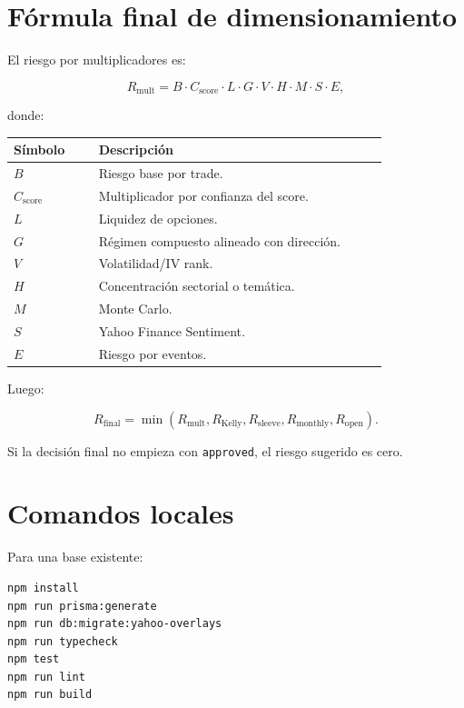 \documentclass[11pt,letterpaper]{article}
\begin{document}
\section{F\'ormula final de dimensionamiento}

El riesgo por multiplicadores es:

\[
R_{\text{mult}} =
B \cdot C_{\text{score}} \cdot L \cdot G \cdot V \cdot H \cdot M \cdot S \cdot E,
\]

donde:

\begin{longtable}{p{0.20\linewidth} p{0.68\linewidth}}
\toprule
\textbf{S\'imbolo} & \textbf{Descripci\'on} \\
\midrule
$B$ & Riesgo base por trade. \\
$C_{\text{score}}$ & Multiplicador por confianza del score. \\
$L$ & Liquidez de opciones. \\
$G$ & R\'egimen compuesto alineado con direcci\'on. \\
$V$ & Volatilidad/IV rank. \\
$H$ & Concentraci\'on sectorial o tem\'atica. \\
$M$ & Monte Carlo. \\
$S$ & Yahoo Finance Sentiment. \\
$E$ & Riesgo por eventos. \\
\bottomrule
\end{longtable}

Luego:

\[
R_{\text{final}} =
\min(R_{\text{mult}}, R_{\text{Kelly}}, R_{\text{sleeve}}, R_{\text{monthly}}, R_{\text{open}}).
\]

Si la decisi\'on final no empieza con \texttt{approved}, el riesgo sugerido es
cero.

\section{Comandos locales}

Para una base existente:

\begin{lstlisting}
npm install
npm run prisma:generate
npm run db:migrate:yahoo-overlays
npm run typecheck
npm test
npm run lint
npm run build
\end{lstlisting}
\end{document}
